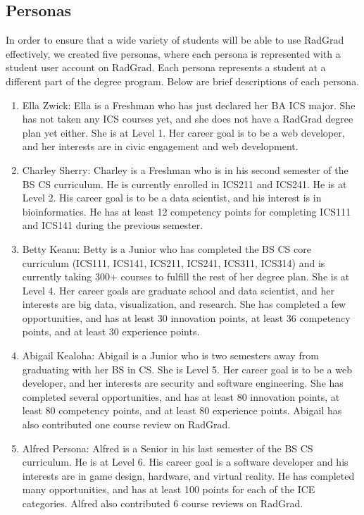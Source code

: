 \subsection{Personas}

In order to ensure that a wide variety of students will be able to use RadGrad effectively, we created five personas, where each persona is represented with a student user account on RadGrad. Each persona represents a student at a different part of the degree program. Below are brief descriptions of each persona. 

\begin{enumerate}
  \item Ella Zwick: Ella is a Freshman who has just declared her BA ICS major. She has not taken any ICS courses yet, and she does not have a RadGrad degree plan yet either. She is at Level 1. Her career goal is to be a web developer, and her interests are in civic engagement and web development. 
  \item Charley Sherry: Charley is a Freshman who is in his second semester of the BS CS curriculum. He is currently enrolled in ICS211 and ICS241. He is at Level 2. His career goal is to be a data scientist, and his interest is in bioinformatics.  He has at least 12 competency points for completing ICS111 and ICS141 during the previous semester. 
  \item Betty Keanu: Betty is a Junior who has completed the BS CS core curriculum (ICS111, ICS141, ICS211, ICS241, ICS311, ICS314) and is currently taking 300+ courses to fulfill the rest of her degree plan. She is at Level 4. Her career goals are graduate school and data scientist, and her interests are big data, visualization, and research. She has completed a few opportunities, and has at least 30 innovation points, at least 36 competency points, and at least 30 experience points. 
  \item Abigail Kealoha: Abigail is a Junior who is two semesters away from graduating with her BS in CS. She is Level 5. Her career goal is to be a web developer, and her interests are security and software engineering. She has completed several opportunities, and has at least 80 innovation points, at least 80 competency points, and at least 80 experience points. Abigail has also contributed one course review on RadGrad. 
  \item Alfred Persona: Alfred is a Senior in his last semester of the BS CS curriculum. He is at Level 6. His career goal is a software developer and his interests are in game design, hardware, and virtual reality. He has completed many opportunities, and has at least 100 points for each of the ICE categories. Alfred also contributed 6 course reviews on RadGrad.
 
\end{enumerate} 


